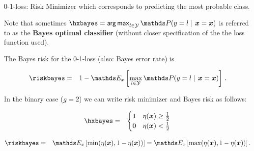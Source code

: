 \begin{vbframe}{0-1-loss: Risk Minimizer}
which corresponds to predicting the most probable class. 

\vspace*{0.2cm} 

Note that sometimes $\hxbayes = \argmax_{l \in \Yspace} \P(y = l~|~ \xv = \xv)$ is referred to as the \textbf{Bayes optimal classifier} (without closer specification of the the loss function used). 

\lz 

The Bayes risk for the 0-1-loss (also: Bayes error rate) is 

\begin{eqnarray*}  
  \riskbayes &=& 1 - \E_x \left[\max_{l \in \Yspace} \P(y = l~|~ \xv = \xv)\right]\,.
\end{eqnarray*}

\lz 

In the binary case ($g = 2$) we can write risk minimizer and Bayes risk as follows:  

\begin{eqnarray*}
  \hxbayes &=& \begin{cases} 1 & \eta(\xv) \ge \frac{1}{2} \\ 0 & \eta(\xv) < \frac{1}{2}\end{cases} \\
\end{eqnarray*}

\vspace*{-0.7cm}

\begin{eqnarray*}
  \riskbayes &=& \E_x\left[\min(\eta(\xv), 1 - \eta(\xv))\right] = \E_x\left[\max(\eta(\xv), 1 - \eta(\xv))\right] . 
\end{eqnarray*}











\end{vbframe}
